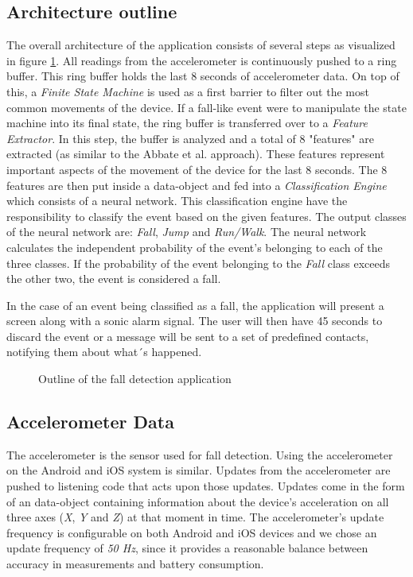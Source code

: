 \documentclass[12pt, a4paper, onecolumn]{article}
\begin{document}
	\subsection{Architecture outline}
	The overall architecture of the application consists of several steps as visualized in figure \ref{fig:arch-outline}. All readings from the accelerometer is continuously pushed to a ring buffer.	This ring buffer holds the last 8 seconds of accelerometer data. On top of this, a \textit{Finite State Machine} is used as a first barrier to filter out the most common movements of the device. If a fall-like event were to manipulate the state machine into its final state, the ring buffer is transferred over to a \textit{Feature Extractor}. In this step, the buffer is analyzed and a total of 8 "features" are extracted (as similar to the Abbate et al. approach). These features represent important aspects of the movement of the device for the last 8 seconds. The 8 features are then put inside a data-object and fed into a \textit{Classification Engine} which consists of a neural network. This classification engine have the responsibility to classify the event based on the given features. The output classes of the neural network are: \textit{Fall}, \textit{Jump} and \textit{Run/Walk}. The neural network calculates the independent probability of the event's belonging to each of the three classes. If the probability of the event belonging to the \textit{Fall} class exceeds the other two, the event is considered a fall. 
	
	In the case of an event being classified as a fall, the application will present a screen along with a sonic alarm signal. The user will then have 45 seconds to discard the event or a message will be sent to a set of predefined contacts, notifying them about what´s happened.
	
	\begin{figure}[H]
		\centering
		\caption{Outline of the fall detection application}%
		\label{fig:arch-outline}%
	\end{figure}
	
	\subsection{Accelerometer Data}
	The accelerometer is the sensor used for fall detection. Using the accelerometer on the Android and iOS system is similar. Updates from the accelerometer are pushed to listening code that acts upon those updates. Updates come in the form of an data-object containing information about the device's acceleration on all three axes (\textit{X}, \textit{Y} and \textit{Z}) at that moment in time. The accelerometer's update frequency is configurable on both Android and iOS devices and we chose an update frequency of \textit{50 Hz}, since it provides a reasonable balance between accuracy in measurements and battery consumption. 
	
\end{document}
